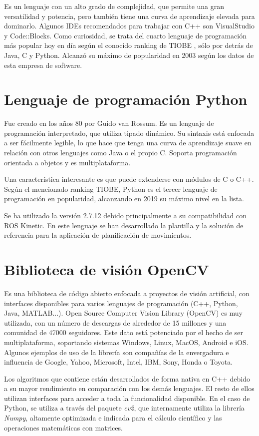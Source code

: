 \documentclass[12pt,spanish,chapterprefix, numbers=noenddot]{book}
\numberwithin{equation}{section}
\numberwithin{figure}{section}
\begin{document}
Es un lenguaje con un alto grado de complejidad, que permite una gran versatilidad y potencia, pero también tiene una curva de aprendizaje elevada para dominarlo.
Algunos IDEs recomendados para trabajar con C++ son VisualStudio y Code::Blocks. 
Como curiosidad, se trata del cuarto lenguaje de programación más popular hoy en día según el conocido ranking de TIOBE \cite{tiobe}, sólo por detrás de Java, C y Python. Alcanzó su máximo de popularidad en 2003 según los datos de esta empresa de software. 

\section{Lenguaje de programación Python}
Fue creado en los años 80 por Guido van Rossum. Es un lenguaje de programación interpretado, que utiliza tipado dinámico. Su sintaxis está enfocada a ser fácilmente legible, lo que hace que tenga una curva de aprendizaje suave en relación con otros lenguajes como Java o el propio C. Soporta programación orientada a objetos y es multiplataforma.

Una característica interesante es que puede extenderse con módulos de C o C++.
Según el mencionado ranking TIOBE, Python es el tercer lenguaje de programación en popularidad, alcanzando en 2019 su máximo nivel en la lista. 

Se ha utilizado la versión 2.7.12 debido principalmente a su compatibilidad con ROS Kinetic. En este lenguaje se han desarrollado la plantilla y la solución de referencia para la aplicación de planificación de movimientos.

\section{Biblioteca de visión OpenCV}
Es una biblioteca de código abierto enfocada a proyectos de visión artificial, con interfaces disponibles para varios lenguajes de programación (C++, Python, Java, MATLAB...). Open Source Computer Vision Library (OpenCV) \cite{opencv} es muy utilizada, con un número de descargas de alrededor de 15 millones y una comunidad de 47000 seguidores. Este dato está potenciado por el hecho de ser multiplataforma, soportando sistemas Windows, Linux, MacOS, Android e iOS. 
Algunos ejemplos de uso de la librería son compañías de la envergadura e influencia de Google, Yahoo, Microsoft, Intel, IBM, Sony, Honda o Toyota.

Los algoritmos que contiene están desarrollados de forma nativa en C++ debido a su mayor rendimiento en comparación con los demás lenguajes. El resto de ellos utilizan interfaces para acceder a toda la funcionalidad disponible. 
En el caso de Python, se utiliza a través del paquete \textit{cv2}, que internamente utiliza la librería \textit{Numpy}, altamente optimizada e indicada para el cálculo científico y las operaciones matemáticas con matrices. 
\end{document}
